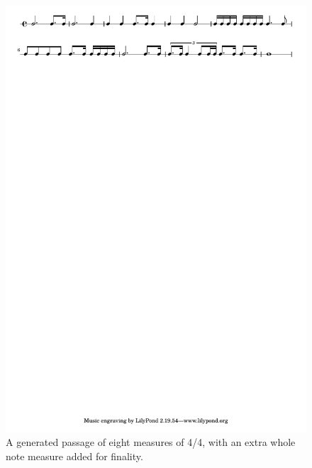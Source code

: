 \documentclass{article}
\begin{document}


\begin{figure}[t] %
\centering
\includegraphics[width=16cm]{4_4_new.pdf}
\caption{A generated passage of eight measures of 4/4, with an extra whole note measure added for finality.}\label{example_4_4}
\end{figure}
\end{document}
